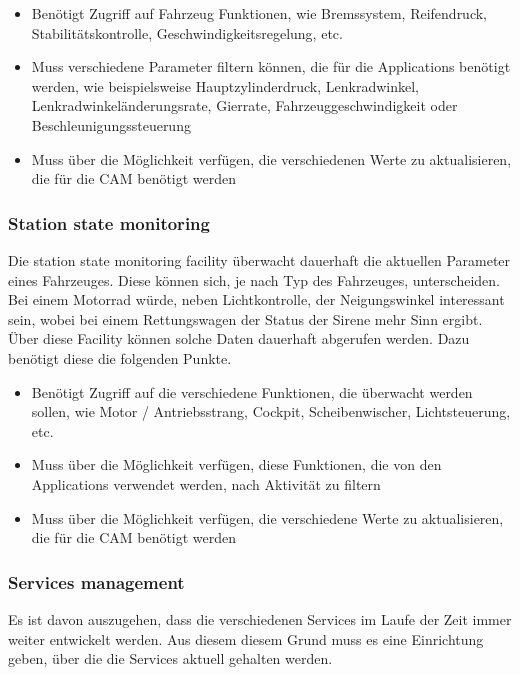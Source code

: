 \begin{itemize}
	\item Benötigt Zugriff auf Fahrzeug Funktionen, wie Bremssystem, Reifendruck, Stabilitätskontrolle, Geschwindigkeitsregelung, etc.
	\item Muss verschiedene Parameter filtern können, die für die Applications benötigt werden, wie beispielsweise Hauptzylinderdruck, Lenkradwinkel, Lenk\-rad\-win\-kel\-än\-der\-ung\-sra\-te, Gierrate, Fahrzeuggeschwindigkeit oder Beschleunigungssteuerung
	\item Muss über die Möglichkeit verfügen, die verschiedenen Werte zu aktualisieren, die für die \ac{CAM} benötigt werden
\end{itemize}

\subsubsection{Station state monitoring \label{facilitylayer_StationStateMonitoring}}
Die station state monitoring facility überwacht dauerhaft die aktuellen Parameter eines Fahrzeuges. Diese können sich, je nach Typ des Fahrzeuges, unterscheiden. Bei einem Motorrad würde, neben Lichtkontrolle, der Neigungswinkel interessant sein, wobei bei einem Rettungswagen der Status der Sirene mehr Sinn ergibt. Über diese Facility können solche Daten dauerhaft abgerufen werden. 
Dazu benötigt diese die folgenden Punkte.
\begin{itemize}
	\item Benötigt Zugriff auf die verschiedene Funktionen, die überwacht werden sollen, wie Motor / Antriebsstrang, Cockpit, Scheibenwischer, Lichtsteuerung, etc.
	\item Muss über die Möglichkeit verfügen, diese Funktionen, die von den Applications verwendet werden, nach Aktivität zu filtern
	\item Muss über die Möglichkeit verfügen, die verschiedene Werte zu aktualisieren, die für die \ac{CAM} benötigt werden
\end{itemize}

\subsubsection{Services management \label{facilitylayer_ServicesManagement} }
Es ist davon auszugehen, dass die verschiedenen Services im Laufe der Zeit immer weiter entwickelt werden. Aus diesem diesem Grund muss es eine Einrichtung geben, über die die Services aktuell gehalten werden.

